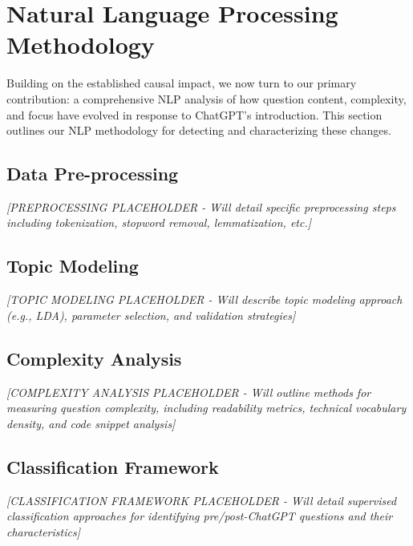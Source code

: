 \section{Natural Language Processing Methodology}
\label{sec:nlp_methodology}

Building on the established causal impact, we now turn to our primary contribution: a comprehensive NLP analysis of how question content, complexity, and focus have evolved in response to ChatGPT's introduction. This section outlines our NLP methodology for detecting and characterizing these changes.

\subsection{Data Pre-processing}
\textit{[PREPROCESSING PLACEHOLDER - Will detail specific preprocessing steps including tokenization, stopword removal, lemmatization, etc.]}

\subsection{Topic Modeling}
\textit{[TOPIC MODELING PLACEHOLDER - Will describe topic modeling approach (e.g., LDA), parameter selection, and validation strategies]}

\subsection{Complexity Analysis}
\textit{[COMPLEXITY ANALYSIS PLACEHOLDER - Will outline methods for measuring question complexity, including readability metrics, technical vocabulary density, and code snippet analysis]}

\subsection{Classification Framework}
\textit{[CLASSIFICATION FRAMEWORK PLACEHOLDER - Will detail supervised classification approaches for identifying pre/post-ChatGPT questions and their characteristics]}